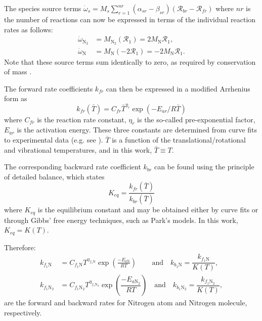 \documentclass[10pt]{article}
\begin{document}
The species source terms $\dot{\omega}_s = M_s \sum_{r=1}^{nr}\left(\alpha_{sr}-\beta_{sr}\right)\left(\mathcal{R}_{br} - \mathcal{R}_{fr}\right)$ 
 where $nr$ is the number of reactions can now be expressed in terms of the individual reaction rates as follows:
\begin{align*}
 \dot{\omega}_{\text{N}_2} &= M_{\text{N}_2}\left(\mathcal{R}_1\right)= 2 M_\text{N} \mathcal{R}_1 ,\\
 \dot{\omega}_{\text{N}} &= M_{\text{N}}\left(-2\mathcal{R}_1 \right)=-2 M_\text{N} \mathcal{R}_1. 
\end{align*}
Note that these source terms sum identically to zero, as required by conservation of mass \citep{Kessler2004}.



The forward rate coefficients  $k_{fr}$  can then be expressed in a modified Arrhenius form as
\begin{equation}
  k_{fr}\left(\bar{T}\right) = C_{fr} \bar{T}^{\eta_r} \exp \left(-E_{ar}/R\bar{T}\right)
\end{equation}
where $C_{fr}$ is the reaction rate constant, $\eta_r$ is the so-called pre-exponential factor, $E_{ar}$ is the activation energy.  These three constants are determined from curve fits to experimental data (e.g. see \cite{Ait1996}). $\bar{T}$ is a function of the translational/rotational and vibrational temperatures, and in this work, $\bar{T}\equiv T$.

The corresponding backward rate coefficient   $k_{br}$  can be found using the principle of detailed balance, which states
\begin{equation}
  K_{eq} = \frac{k_{fr}\left(\bar{T}\right)}{k_{br}\left(\bar{T}\right)}
\end{equation}
where $K_{eq}$ is the equilibrium constant and may be obtained either by curve fits or through Gibbs' free energy techniques, such as Park's models. In this work, $K_{eq}=K(T)$.


Therefore:
\begin{equation}
 \begin{split}
\label{eq:forward_rates1}
k_{f_1 \text{N}} &= C_{f_1 \text{N}} T^{\eta_{f_1 \text{N}}} \exp\left(\frac{-E_{a\text{N}}}{R T}\right) \qquad \,\mbox{and}\quad k_{b_1 \text{N}} = \dfrac{k_{f_1 \text{N}}}{K(T)},\\
%
k_{f_1 \text{N}_2} &= C_{f_1 \text{N}_2} T^{\eta_{f_1 \text{N}_2}} \exp\left(\dfrac{-E_{a\text{N}_2}}{R T}\right) \quad \mbox{and}\quad k_{b_1 \text{N}_2} = \dfrac{k_{f_1 \text{N}_2}}{K(T)},
%
 \end{split}
\end{equation}
are the forward and backward rates for Nitrogen atom and Nitrogen molecule, respectively.
\end{document}
